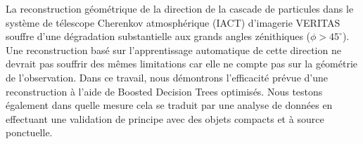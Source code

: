 \documentclass[main.tex]{subfiles}
\begin{document}
La reconstruction g\'eom\'etrique de la direction de la cascade de particules dans le système de t\'elescope Cherenkov atmosph\'erique (IACT) d'imagerie VERITAS souffre d'une d\'egradation substantielle aux grands angles z\'enithiques ($ \phi> 45 ^{\circ} $). Une reconstruction bas\'e sur l'apprentissage automatique de cette direction ne devrait pas souffrir des m\^emes limitations car elle ne compte pas sur la g\'eom\'etrie de l'observation. Dans ce travail, nous d\'emontrons l'efficacit\'e pr\'evue d'une reconstruction \`a l'aide de Boosted Decision Trees optimis\'es. Nous testons \'egalement dans quelle mesure cela se traduit par une analyse de donn\'ees en effectuant une validation de principe avec des objets compacts et \`a source ponctuelle.
\end{document}
